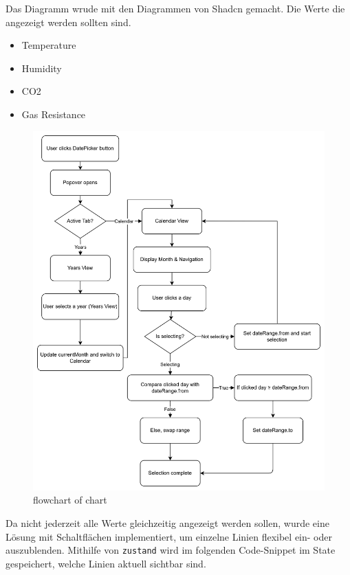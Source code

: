 \begin{inhalt}
\begin{enumerate}[label=\textbf{\arabic*.}]
Das Diagramm wrude mit den Diagrammen von Shadcn gemacht. Die Werte die angezeigt werden sollten sind.

\begin{itemize}
    \item Temperature

    \item Humidity

    \item CO2

    \item Gas Resistance
\end{itemize}

\begin{figure}[!htb]
\centering
\includegraphics[width=1\textwidth]{files/Thomas/pics/Website/dashbord/dashbaord-datepicker-flowchart.png}
\caption[Bildbezeichnung für Abbildungsverzeichnis]{flowchart of chart}
\label{fig:gehaeuse_internet_bild}
\end{figure}

Da nicht jederzeit alle Werte gleichzeitig angezeigt werden sollen, wurde eine Lösung mit Schaltflächen implementiert, um einzelne Linien flexibel ein- oder auszublenden.
Mithilfe von \texttt{zustand} wird im folgenden Code-Snippet im State gespeichert, welche Linien aktuell sichtbar sind.


\end{enumerate}
\end{inhalt}
